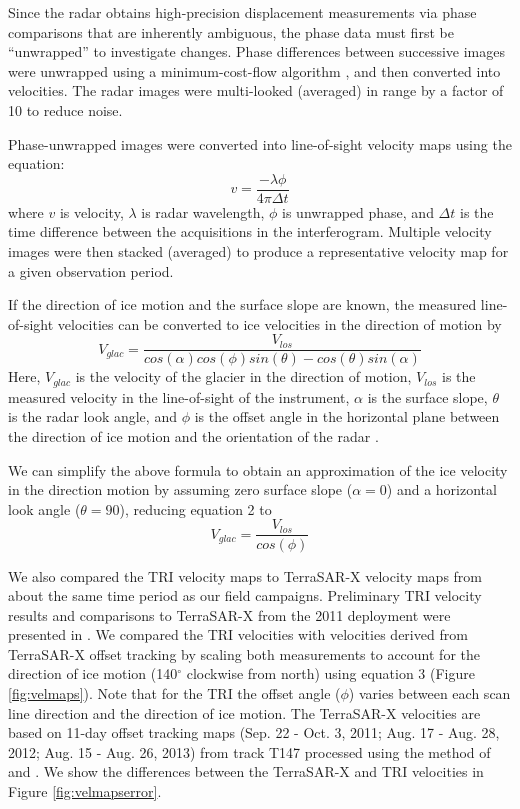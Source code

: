 \documentclass[review]{igs}
\begin{document}
Since the radar obtains high-precision displacement measurements via phase comparisons that are inherently ambiguous, the phase data must first be ``unwrapped'' to investigate changes. Phase differences between successive images were unwrapped using a minimum-cost-flow algorithm \citep{costantini1998novel}, and then converted into velocities. The radar images were multi-looked (averaged) in range by a factor of 10 to reduce noise.

Phase-unwrapped images were converted into line-of-sight velocity maps using the equation:
  \begin{equation}v=\frac{-\lambda\phi}{4\pi\Delta t}\end{equation}  
where $v$ is velocity, $\lambda$ is radar wavelength, $\phi$ is unwrapped phase, and $\Delta t$ is the time difference between the acquisitions in the interferogram. Multiple velocity images were then stacked (averaged) to produce a representative velocity map for a given observation period. 

If the direction of ice motion and the surface slope are known, the measured line-of-sight velocities can be converted to ice velocities in the direction of motion by 
  \begin{equation} V_{glac}=\frac{V_{los}}{cos(\alpha)cos(\phi)sin(\theta)-cos(\theta)sin(\alpha)}\end{equation} 
Here, $V_{glac}$ is the velocity of the glacier in the direction of motion, $V_{los}$ is the measured velocity in the line-of-sight of the instrument, $\alpha$ is the surface slope, $\theta$ is the radar look angle, and $\phi$ is the offset angle in the horizontal plane between the direction of ice motion and the orientation of the radar \citep{kwokandfahnestock}.

We can simplify the above formula to obtain an approximation of the ice velocity in the direction motion by assuming zero surface slope ($\alpha=0$) and a horizontal look angle ($\theta=90$), reducing equation 2 to 
  \begin{equation}  V_{glac}=\frac{V_{los}}{cos(\phi)}\end{equation} 
 
 
We also compared the TRI velocity maps to TerraSAR-X velocity maps from about the same time period as our field campaigns. Preliminary TRI
velocity results and comparisons to TerraSAR-X from the 2011 deployment were presented in \citet{voytenko2012monitoring}.
We compared the TRI velocities with velocities derived from TerraSAR-X offset tracking by scaling both measurements to account for the direction of ice motion (140$^{\circ}$ clockwise from north) using equation 3 (Figure \ref{fig:velmaps}). Note that for the TRI the offset angle ($\phi$) varies between each scan line direction and the direction of ice motion. The TerraSAR-X velocities are based on 11-day offset tracking maps (Sep. 22 - Oct. 3, 2011; Aug. 17 - Aug. 28, 2012; Aug. 15 - Aug. 26, 2013) from track T147 processed using the method of \citet{strozzi2002glacier} and \citet{ paul2013glaciers}. We show the differences between the TerraSAR-X and TRI velocities in Figure \ref{fig:velmapserror}.
\end{document}
